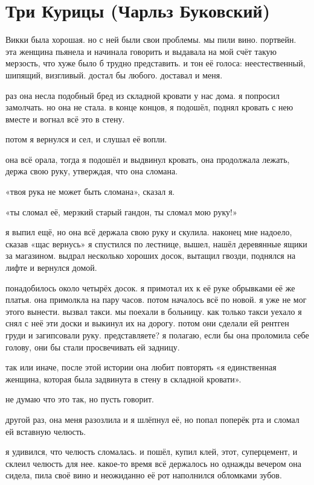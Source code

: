  
\section*{Три Курицы (Чарльз Буковский)}

Викки была хорошая.
но с ней были свои проблемы.
мы пили вино.
портвейн.
эта женщина пьянела и начинала говорить и выдавала на мой счёт такую мерзость,
что хуже было б трудно представить.
и тон её голоса: неестественный, шипящий, 
визгливый.
достал бы любого.
доставал и меня.

раз она несла подобный бред из складной кровати у нас дома.
я попросил замолчать.
но она не стала.
в конце концов, я подошёл, поднял кровать с нею
вместе и вогнал всё это в стену.

потом я вернулся и сел, и слушал её вопли.

она всё орала, тогда я подошёл и выдвинул кровать, она продолжала лежать,
держа свою руку, утверждая, что она сломана.

«твоя рука не может быть сломана», сказал я.

«ты сломал её, мерзкий старый гандон, ты сломал мою руку!»

я выпил ещё, но она всё держала свою руку и скулила.
наконец мне надоело, сказав «щас вернусь» я спустился по лестнице, вышел, нашёл деревянные ящики за магазином.
выдрал несколько хороших досок, вытащил гвозди, поднялся на лифте и вернулся домой.

понадобилось около четырёх досок.
я примотал их к её руке обрывками её же платья.
она примолкла на пару часов.
потом началось всё по новой.
я уже не мог этого вынести.
вызвал такси.
мы поехали в больницу.
как только такси уехало я снял с неё эти доски и выкинул их на дорогу.
потом они сделали ей рентген груди и загипсовали руку.
представляете?
я полагаю, если бы она проломила себе голову, они бы стали просвечивать ей задницу.

так или иначе, после этой истории она любит повторять «я единственная женщина, которая была задвинута в стену в складной кровати».

не думаю что это так, но пусть говорит.

другой раз, она меня разозлила и я шлёпнул её, но попал поперёк рта и
сломал ей вставную челюсть.

я удивился, что челюсть сломалась.
и пошёл, купил клей, этот,
суперцемент, и склеил челюсть для нее.
какое-то время всё держалось но 
однажды вечером она сидела, пила своё вино и неожиданно её рот наполнился 
обломками зубов.

